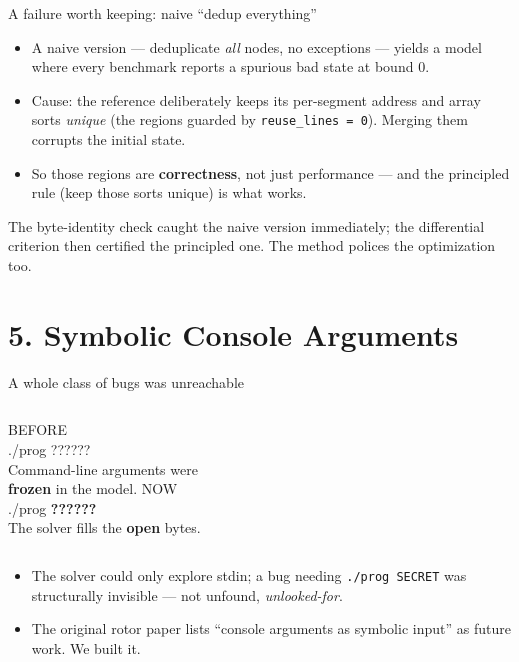 \documentclass[aspectratio=169]{beamer}
\newcommand{\lab}[1]{{\footnotesize\color{ink!65}#1}}
\newcommand{\key}[1]{\textbf{\color{accentdk}#1}}
\begin{document}
\begin{frame}{A failure worth keeping: naive ``dedup everything''}
  \begin{itemize}\setlength\itemsep{0.35em}\footnotesize
    \item A naive version --- deduplicate \emph{all} nodes, no exceptions ---
          yields a model where every benchmark reports a spurious bad state
          at \alert{bound 0}.
    \item Cause: the reference deliberately keeps its per-segment address and
          array sorts \emph{unique} (the regions guarded by
          \texttt{reuse\_lines = 0}). Merging them corrupts the initial state.
    \item So those regions are \key{correctness}, not just performance --- and
          the principled rule (keep those sorts unique) is what works.
  \end{itemize}
  \vfill
  \lab{The byte-identity check caught the naive version immediately; the
       differential criterion then certified the principled one. The method
       polices the optimization too.}
\end{frame}

\section{5. Symbolic Console Arguments}

\begin{frame}{A whole class of bugs was unreachable}
  \begin{columns}[c]
    \centering
      \lab{BEFORE}\\[6pt]
      {\large\ttfamily ./prog \textcolor{faint}{??????}}\\[6pt]
      {\footnotesize Command-line arguments were\\ \textbf{frozen} in the
       model.}
    \centering
      \lab{NOW}\\[6pt]
      {\large\ttfamily ./prog \textcolor{accent}{\textbf{??????}}}\\[6pt]
      {\footnotesize The solver fills the \textbf{open} bytes.}
  \end{columns}
  \vfill
  \begin{itemize}\setlength\itemsep{0.2em}\footnotesize
    \item The solver could only explore stdin; a bug needing \texttt{./prog
          SECRET} was structurally invisible --- not unfound, \emph{unlooked-for}.
    \item The original rotor paper lists ``console arguments as symbolic
          input'' as \alert{future work}. We built it.
  \end{itemize}
\end{frame}
\end{document}
